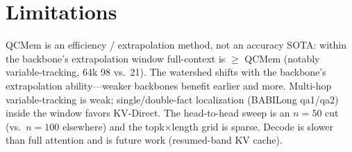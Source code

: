 \section{Limitations}
QCMem is an efficiency / extrapolation method, not an accuracy SOTA: within the
backbone's extrapolation window full-context is $\ge$ QCMem (notably
variable-tracking, 64k 98 vs.\ 21). The watershed shifts with the backbone's
extrapolation ability---weaker backbones benefit earlier and more. Multi-hop
variable-tracking is weak; single/double-fact localization (BABILong qa1/qa2)
inside the window favors KV-Direct. The head-to-head sweep is an $n{=}50$ cut
(vs.\ $n{=}100$ elsewhere) and the topk$\times$length grid is sparse. Decode is
slower than full attention and is future work (resumed-band KV cache).
